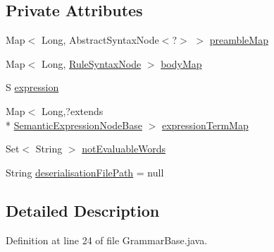 \subsection*{Private Attributes}
\begin{DoxyCompactItemize}
\item 
Map$<$ Long, Abstract\-Syntax\-Node$<$?$>$ $>$ \hyperlink{classit_1_1emarolab_1_1cagg_1_1core_1_1evaluation_1_1semanticGrammar_1_1syntaxCompiler_1_1Grammac6e795d7438edf939adda9d5323937f2_a85d9aae0348bfc1fc18319ca50e7c6fe}{preamble\-Map}
\item 
Map$<$ Long, \hyperlink{classit_1_1emarolab_1_1cagg_1_1core_1_1language_1_1syntax_1_1abstractTree_1_1syntaxNodeType_1_1RuleSyntaxNode}{Rule\-Syntax\-Node} $>$ \hyperlink{classit_1_1emarolab_1_1cagg_1_1core_1_1evaluation_1_1semanticGrammar_1_1syntaxCompiler_1_1Grammac6e795d7438edf939adda9d5323937f2_a2ce41a043dd7f1984b6213b981f4ff38}{body\-Map}
\item 
S \hyperlink{classit_1_1emarolab_1_1cagg_1_1core_1_1evaluation_1_1semanticGrammar_1_1syntaxCompiler_1_1Grammac6e795d7438edf939adda9d5323937f2_ab2a5e20668a23d030c0e1fd4d73b6086}{expression}
\item 
Map$<$ Long,?extends \\*
\hyperlink{classit_1_1emarolab_1_1cagg_1_1core_1_1evaluation_1_1semanticGrammar_1_1syntaxCompiler_1_1Semantec1f2fc886c35d505e2bc10592e2dff6}{Semantic\-Expression\-Node\-Base} $>$ \hyperlink{classit_1_1emarolab_1_1cagg_1_1core_1_1evaluation_1_1semanticGrammar_1_1syntaxCompiler_1_1Grammac6e795d7438edf939adda9d5323937f2_a651cd84f4653fd5f404016054f314abf}{expression\-Term\-Map}
\item 
Set$<$ String $>$ \hyperlink{classit_1_1emarolab_1_1cagg_1_1core_1_1evaluation_1_1semanticGrammar_1_1syntaxCompiler_1_1Grammac6e795d7438edf939adda9d5323937f2_a44cf57bc19157d79c587dee15fcec4d3}{not\-Evaluable\-Words}
\item 
String \hyperlink{classit_1_1emarolab_1_1cagg_1_1core_1_1evaluation_1_1semanticGrammar_1_1syntaxCompiler_1_1Grammac6e795d7438edf939adda9d5323937f2_a5ccbe5135f83da22071cdfe95cfaceac}{deserialisation\-File\-Path} = null
\end{DoxyCompactItemize}


\subsection{Detailed Description}


Definition at line 24 of file Grammar\-Base.\-java.



